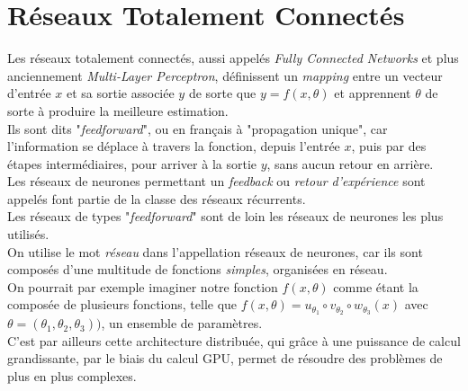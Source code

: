 \documentclass[10pt,a4paper]{report}
\begin{document}
	\section{Réseaux Totalement Connectés}
	Les réseaux totalement connectés, aussi appelés \emph{Fully Connected Networks} et plus anciennement \emph{Multi-Layer Perceptron}, définissent un \emph{mapping} entre un vecteur d'entrée $x$ et sa sortie associée $y$ de sorte que $y = f(x,\theta)$ et apprennent $\theta$ de sorte à produire la meilleure estimation.\\
	Ils sont dits "\emph{feedforward}", ou en français à "propagation unique", car l'information se déplace à travers la fonction, depuis l'entrée $x$, puis par des étapes intermédiaires, pour arriver à la sortie $y$, sans aucun retour en arrière.\\
	Les réseaux de neurones permettant un \emph{feedback} ou \emph{retour d'expérience} sont appelés font partie de la classe des réseaux récurrents.\\
	Les réseaux de types "\emph{feedforward}" sont de loin les réseaux de neurones les plus utilisés.\\
	On utilise le mot \emph{réseau} dans l’appellation réseaux de neurones, car ils sont composés d'une multitude de fonctions \emph{simples}, organisées en réseau.\\
	On pourrait par exemple imaginer notre fonction $f(x,\theta)$ comme étant la composée de plusieurs fonctions, telle que $f(x,\theta) = u_{\theta_1} \circ v_{\theta_2} \circ w_{\theta_3}(x)$ avec $\theta = (\theta_1,\theta_2, \theta_3))$, un ensemble de paramètres.\\
	C'est par ailleurs cette architecture distribuée, qui grâce à une puissance de calcul grandissante, par le biais du calcul GPU, permet de résoudre des problèmes de plus en plus complexes.
\end{document}
